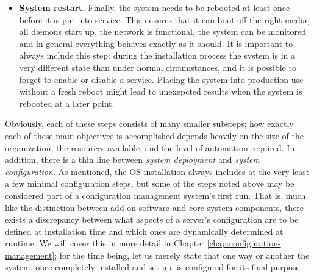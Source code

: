 \begin{itemize}
	\item {\bf System restart.}
		Finally, the system needs to be rebooted at least once
		before it is put into service.  This ensures that it can
		boot off the right media, all d\ae mons start up, the
		network is functional, the system can be monitored and in
		general everything behaves exactly as it should.  It is
		important to always include this step: during the
		installation process the system is in a very different
		state than under normal circumstances, and it is possible
		to forget to enable or disable a service.  Placing the
		system into production use without a fresh reboot might
		lead to unexepcted results when the system is rebooted at
		a later point.
\end{itemize}

Obviously, each of these steps consists of many
smaller substeps; how exactly each of these main
objectives is accomplished depends heavily on the size
of the organization, the resources available, and the
level of automation required.  In addition, there is a
thin line between {\em system deployment} and {\em system configuration}.  As
mentioned, the OS installation always includes at the
very least a few minimal configuration steps, but some
of the steps noted above may be considered part of a
configuration management system's first run.  That is,
much like the distinction between add-on software and
core system components, there exists a discrepancy
between what aspects of a server's configuration are
to be defined at installation time and which ones are
dynamically determined at runtime.  We will cover this
in more detail in Chapter
\ref{chap:configuration-management}; for the time
being, let us merely state that one way or another the
system, once completely installed and set up, is
configured for its final purpose.

